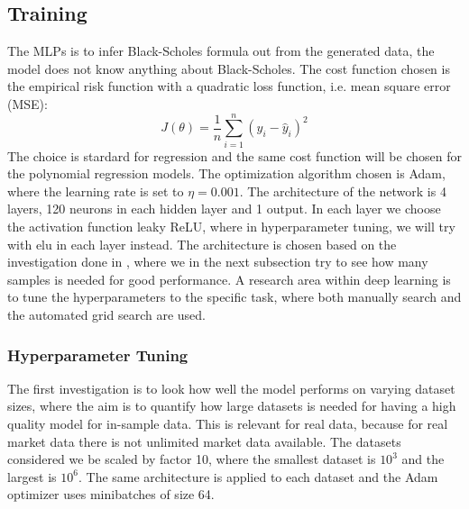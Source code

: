 
\subsection{Training}
The MLPs is to infer Black-Scholes formula out from the generated data, the model does not know anything about Black-Scholes. The cost function chosen is the empirical risk function with a quadratic loss function, i.e. mean square error (MSE):
$$J(\theta)= \frac{1}{n} \sum_{i=1}^{n}(y_i-\hat{y}_i)^2$$
The choice is stardard for regression and the same cost function will be chosen for the polynomial regression models. The optimization algorithm chosen is Adam, where the learning rate is set to $\eta=0.001$. The architecture of the network is 4 layers, 120 neurons in each hidden layer and 1 output. In each layer we choose the activation function leaky ReLU, where in hyperparameter tuning, we will try with elu in each layer instead. The architecture is chosen based on the investigation done in  \parencite{HirsaAli2019}, where we in the next subsection try to see how many samples is needed for good performance. A research area within deep learning is to tune the hyperparameters to the specific task, where both manually search and the automated grid search are used. 

\subsubsection{Hyperparameter Tuning}
The first investigation is to look how well the model performs on varying dataset sizes, where the aim is to quantify how large datasets is needed for having a high quality model for in-sample data. This is relevant for real data, because for real market data there is not unlimited market data available. The datasets considered we be scaled by factor 10, where the smallest dataset is $10^3$ and the largest is $10^6$. The same architecture is applied to each dataset and the Adam optimizer uses minibatches of size 64.

